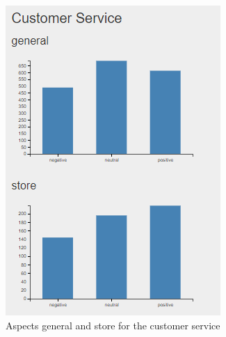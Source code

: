 \documentclass[10pt,a4paper]{article}
\begin{document}
		\FloatBarrier
		\begin{figure}[!h]
  \centering
  \begin{minipage}[b]{0.455\textwidth}
    \includegraphics[width=\textwidth]{data/custService1}
    \caption{ Aspects general and store for the customer service}
	\label{fig:custServ1}
  \end{minipage}
  \hfill
  \begin{minipage}[b]{0.48\textwidth}

\end{minipage}
\end{figure}
\end{document}
